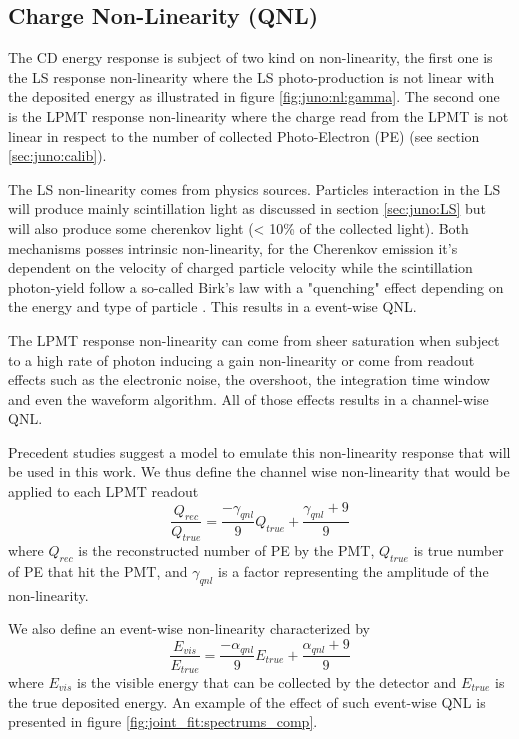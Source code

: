 \documentclass[../main.tex]{subfiles}
\begin{document}
\subsection{Charge Non-Linearity (QNL)}
\label{sec:joint_fit:qnl}

The CD energy response is subject of two kind on non-linearity, the first one is the LS response non-linearity where the LS photo-production is not linear with the deposited energy as illustrated in figure \ref{fig:juno:nl:gamma}. The second one is the LPMT response non-linearity where the charge read from the LPMT is not linear in respect to the number of collected Photo-Electron (PE) (see section \ref{sec:juno:calib}).

The LS non-linearity comes from physics sources. Particles interaction in the LS will produce mainly scintillation light as discussed in section \ref{sec:juno:LS} but will also produce some cherenkov light (< 10\% of the collected light). Both mechanisms posses intrinsic non-linearity, for the Cherenkov emission it's dependent on the velocity of charged particle velocity while the scintillation photon-yield follow a so-called Birk's law with a "quenching" effect depending on the energy and type of particle \cite{particle_data_group_review_2020}. This results in a event-wise QNL.

The LPMT response non-linearity can come from sheer saturation when subject to a high rate of photon inducing a gain non-linearity or come from readout effects such as the electronic noise, the overshoot, the integration time window and even the waveform algorithm. All of those effects results in a channel-wise QNL.

Precedent studies \cite{han_dual_2021} suggest a model to emulate this non-linearity response that will be used in this work. We thus define the channel wise non-linearity that would be applied to each LPMT readout
\begin{equation}
  \label{eq:joint_fit:gamma_yang}
  \frac{Q_{rec}}{Q_{true}} = \frac{-\gamma_{qnl}}{9} Q_{true} + \frac{\gamma_{qnl} + 9}{9}
\end{equation}
where $Q_{rec}$ is the reconstructed number of PE by the PMT, $Q_{true}$ is true number of PE that hit the PMT, and $\gamma_{qnl}$ is a factor representing the amplitude of the non-linearity.

We also define an event-wise non-linearity characterized by
\begin{equation}
  \label{eq:joint_fit:alpha_yang}
  \frac{E_{vis}}{E_{true}} = \frac{-\alpha_{qnl}}{9} E_{true} + \frac{\alpha_{qnl} + 9}{9}
\end{equation}
where $E_{vis}$ is the visible energy that can be collected by the detector and $E_{true}$ is the true deposited energy. An example of the effect of such event-wise QNL is presented in figure \ref{fig:joint_fit:spectrums_comp}.
\end{document}
